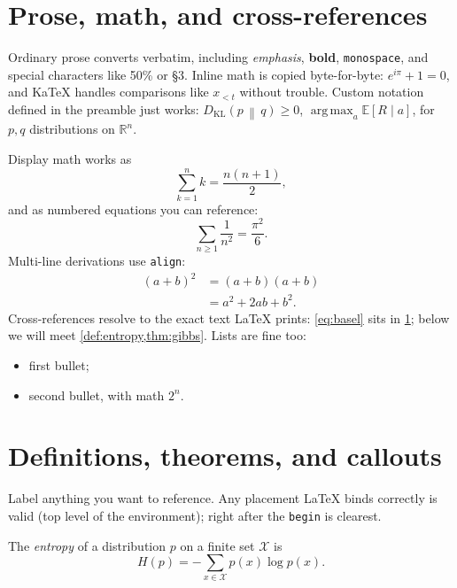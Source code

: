 \documentclass[11pt]{article}
\newcommand{\R}{\mathbb{R}}
\newcommand{\E}{\mathbb{E}}
\newcommand{\KL}[2]{D_{\mathrm{KL}}\!\left(#1 \,\middle\|\, #2\right)}
\DeclareMathOperator*{\argmax}{arg\,max}
\begin{document}
\section{Prose, math, and cross-references}
\label{sec:basics}

Ordinary prose converts verbatim, including \emph{emphasis}, \textbf{bold},
\texttt{monospace}, and special characters like 50\% or \S3. Inline math is
copied byte-for-byte: $e^{i\pi} + 1 = 0$, and KaTeX handles comparisons like
$x_{<t}$ without trouble. Custom notation defined in the preamble just works:
$\KL{p}{q} \geq 0$, $\argmax_{a} \E[R \mid a]$, for $p, q$ distributions on
$\R^n$.

Display math works as \, \[ \sum_{k=1}^{n} k = \frac{n(n+1)}{2}, \]
and as numbered equations you can reference:
\begin{equation}
  \label{eq:basel}
  \sum_{n \geq 1} \frac{1}{n^2} = \frac{\pi^2}{6}.
\end{equation}
Multi-line derivations use \texttt{align}:
\begin{align}
  (a+b)^2 &= (a+b)(a+b) \\
          &= a^2 + 2ab + b^2.
\end{align}
Cross-references resolve to the exact text LaTeX prints: \cref{eq:basel} sits
in \cref{sec:basics}; below we will meet \cref{def:entropy,thm:gibbs}. Lists
are fine too:
\begin{itemize}
  \item first bullet;
  \item second bullet, with math $2^n$.
\end{itemize}

\section{Definitions, theorems, and callouts}
\label{sec:results}

Label anything you want to reference. Any placement \LaTeX{} binds correctly
is valid (top level of the environment); right after the \texttt{begin} is
clearest.

\begin{definition}[entropy]
\label{def:entropy}
The \emph{entropy} of a distribution $p$ on a finite set $\mathcal{X}$ is
\[ H(p) = -\sum_{x \in \mathcal{X}} p(x) \log p(x). \]
\end{definition}
\end{document}
